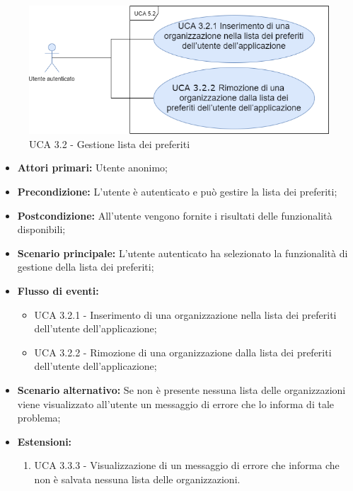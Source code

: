 \begin{figure}[h]
	\centering
	
	\includegraphics[scale=0.5]{sezioni/UseCase/Immagini/UCA3.2.png}
	\caption{UCA 3.2 - Gestione lista dei preferiti}
\end{figure}

\begin{itemize}
	\item \textbf{Attori primari:} Utente anonimo;
	\item \textbf{Precondizione:} L'utente è autenticato e può gestire la lista dei preferiti;
	\item \textbf{Postcondizione:} All'utente vengono fornite i risultati delle funzionalità disponibili;
	\item \textbf{Scenario principale:} L'utente autenticato ha selezionato la funzionalità di gestione della lista dei preferiti;
	\item \textbf{Flusso di eventi:}
			\begin{itemize}
			\item UCA 3.2.1 - Inserimento di una organizzazione nella lista dei preferiti dell'utente dell'applicazione;
			\item UCA 3.2.2 - Rimozione di una organizzazione dalla lista dei preferiti dell'utente dell'applicazione;
			\end{itemize}
	\item \textbf{Scenario alternativo:} Se non è presente nessuna lista delle organizzazioni viene visualizzato all'utente un messaggio di errore che lo informa di tale problema;
	\item \textbf{Estensioni:}
	\begin{enumerate}
		\item UCA 3.3.3 - Visualizzazione di un messaggio di errore che informa che non è salvata nessuna lista delle organizzazioni.
	\end{enumerate}
\end{itemize}

